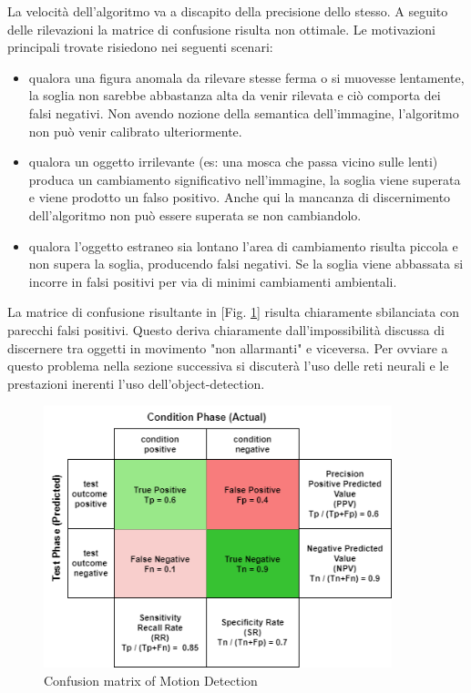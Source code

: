     La velocità dell'algoritmo va a discapito della precisione dello stesso. A seguito delle rilevazioni la matrice di confusione risulta non ottimale. Le motivazioni principali trovate risiedono nei seguenti scenari:
    \begin{itemize}
        \item qualora una figura anomala da rilevare stesse ferma o si muovesse lentamente, la soglia non sarebbe abbastanza alta da venir rilevata e ciò comporta dei falsi negativi. Non avendo nozione della semantica dell'immagine, l'algoritmo non può venir calibrato ulteriormente.
        \item qualora un oggetto irrilevante (es: una mosca che passa vicino sulle lenti) produca un cambiamento significativo nell'immagine, la soglia viene superata e viene prodotto un falso positivo. Anche qui la mancanza di discernimento dell'algoritmo non può essere superata se non cambiandolo.
        \item qualora l'oggetto estraneo sia lontano l'area di cambiamento risulta piccola e non supera la soglia, producendo falsi negativi. Se la soglia viene abbassata si incorre in falsi positivi per via di minimi cambiamenti ambientali.
    \end{itemize}
    
    La matrice di confusione risultante in [Fig. \ref{fig:MDmatrix}] risulta chiaramente sbilanciata con parecchi falsi positivi. Questo deriva chiaramente dall'impossibilità discussa di discernere tra oggetti in movimento "non allarmanti" e viceversa.
    Per ovviare a questo problema nella sezione successiva si discuterà l'uso delle reti neurali e le prestazioni inerenti l'uso dell'object-detection.
    \begin{figure}[H]
        \caption{Confusion matrix of Motion Detection}
        \label{fig:MDmatrix}
        \centering
        \includegraphics[width=0.9\textwidth]{DrawIo/ConfusionMatrixMotDet.png}
    \end{figure}


